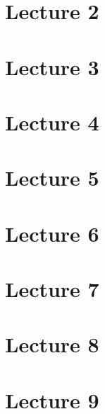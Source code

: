 \documentclass[a4paper,12pt,english]{article}
\begin{document}
\setcounter{section}{1}
\section{Lecture 2}


\section{Lecture 3}


\section{Lecture 4}


\section{Lecture 5}


\section{Lecture 6}


\section{Lecture 7}


\section{Lecture 8}


\section{Lecture 9}

\end{document}
